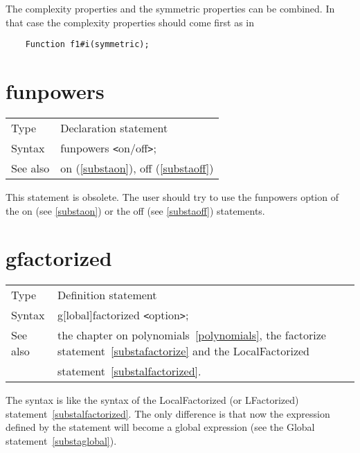 \noindent The complexity properties and the symmetric properties can be 
combined. In that case the complexity properties should come first as in
\begin{verbatim}
    Function f1#i(symmetric);
\end{verbatim}
\vspace{10mm}


\section{funpowers}
\label{substafunpowers}

\noindent \begin{tabular}{ll}
Type & Declaration statement\\
Syntax & funpowers {\tt<}on/off{\tt>};
\\ See also & on (\ref{substaon}), off (\ref{substaoff})
\end{tabular} \vspace{4mm}

\noindent This statement is obsolete. The 
user should try to use the funpowers option of the on (see 
\ref{substaon}) or the off (see \ref{substaoff}) statements. 
\vspace{10mm}


\section{gfactorized}
\label{substagfactorized}

\noindent \begin{tabular}{ll}
Type & Definition statement\\
Syntax & g[lobal]factorized {\tt<}option{\tt>};
\\ See also & the chapter on polynomials~\ref{polynomials}, the 
factorize statement~\ref{substafactorize} and the LocalFactorized \\ &
statement~\ref{substalfactorized}.\hfill
\end{tabular}
\smallskip

\noindent The syntax is like the syntax of the LocalFactorized (or 
LFactorized) statement~\ref{substalfactorized}. The only difference is that 
now the expression defined by the statement will become a global 
expression (see the Global statement~\ref{substaglobal}).
\vspace{10mm}

